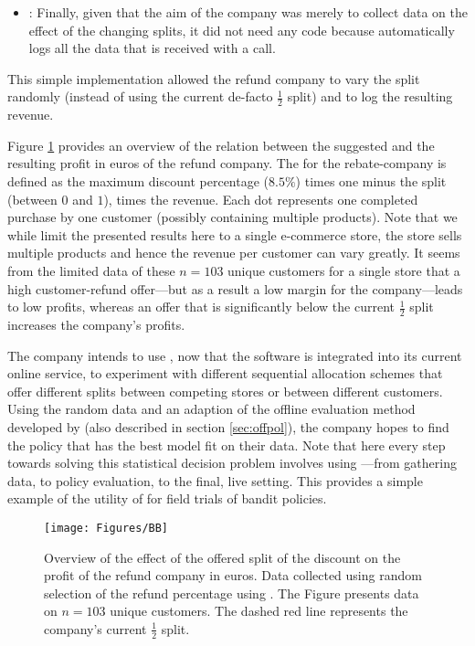 \documentclass[nojss]{jss}
\begin{document}
\begin{itemize}
\item {}: Finally, given that the aim of the company was merely to collect data on the effect of the changing splits, it did not need any  code because  automatically logs all the data that is received with a  call.
\end{itemize}

This simple implementation allowed the refund company to vary the split randomly (instead of using the current de-facto $\frac{1}{2}$ split) and to log the resulting revenue. 

Figure \ref{fig:BB} provides an overview of the relation between the suggested  and the resulting profit in euros of the refund company. The  for the rebate-company is defined as the maximum discount percentage ($8.5\%$) times one minus the split (between $0$ and $1$), times the revenue. Each dot represents one completed purchase by one customer (possibly containing multiple products). Note that we while limit the presented results here to a single e-commerce store, the store sells multiple products and hence the revenue per customer can vary greatly. It seems from the limited data of these $n=103$ unique customers for a single store that a high customer-refund offer---but as a result a low margin for the company---leads to low profits, whereas an offer that is significantly below the current $\frac{1}{2}$ split increases the company's profits.

The company intends to use , now that the software is integrated into its current online service, to experiment with different sequential allocation schemes that offer different splits between competing stores or between different customers. Using the random data and an adaption of the offline evaluation method developed by \citep{Li2010a} (also described in section \ref{sec:offpol}), the company hopes to find the policy that has the best model fit on their data. Note that here every step towards solving this statistical decision problem involves using ---from gathering data, to policy evaluation, to the final, live setting. This provides a simple example of the utility of  for field trials of bandit policies.


\begin{figure}[h!]
  \centering
    \texttt{[image: Figures/BB]}
      \caption{Overview of the effect of the offered split of the discount on the profit of the refund company in euros. Data collected using random selection of the refund percentage using . The Figure presents data on $n=103$ unique customers. The dashed red line represents the company's current $\frac{1}{2}$ split.}
       \label{fig:BB}
\end{figure}
\end{document}
